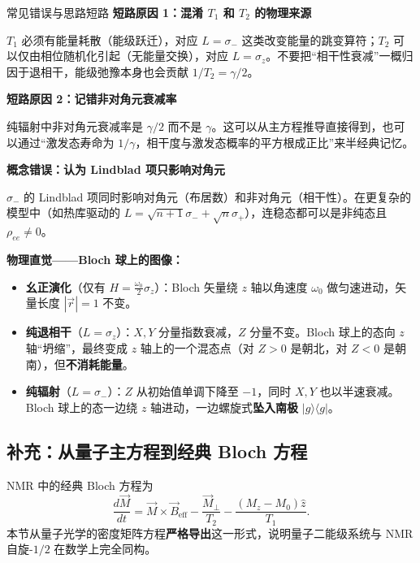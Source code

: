 \begin{errorbox}[colback=white]{常见错误与思路短路}
\textbf{短路原因 1：混淆 $T_1$ 和 $T_2$ 的物理来源}

$T_1$ 必须有能量耗散（能级跃迁），对应 $L=\sigma_-$ 这类改变能量的跳变算符；$T_2$ 可以仅由相位随机化引起（无能量交换），对应 $L=\sigma_z$。不要把``相干性衰减''一概归因于退相干，能级弛豫本身也会贡献 $1/T_2 = \gamma/2$。

\textbf{短路原因 2：记错非对角元衰减率}

纯辐射中非对角元衰减率是 $\gamma/2$ 而不是 $\gamma$。这可以从主方程推导直接得到，也可以通过``激发态寿命为 $1/\gamma$，相干度与激发态概率的平方根成正比''来半经典记忆。

\textbf{概念错误：认为 Lindblad 项只影响对角元}

$\sigma_-$ 的 Lindblad 项同时影响对角元（布居数）和非对角元（相干性）。在更复杂的模型中（如热库驱动的 $L=\sqrt{n+1}\sigma_- + \sqrt{n}\sigma_+$），连稳态都可以是非纯态且 $\rho_{ee}\neq 0$。
\end{errorbox}

\begin{insightbox}[举一反三与物理直觉]
\textbf{物理直觉——Bloch 球上的图像：}

\begin{itemize}[nosep]
    \item \textbf{幺正演化}（仅有 $H=\frac{\omega_0}{2}\sigma_z$）：Bloch 矢量绕 $z$ 轴以角速度 $\omega_0$ 做匀速进动，矢量长度 $|\vec{r}|=1$ 不变。
    \item \textbf{纯退相干}（$L=\sigma_z$）：$X,Y$ 分量指数衰减，$Z$ 分量不变。Bloch 球上的态向 $z$ 轴``坍缩''，最终变成 $z$ 轴上的一个混态点（对 $Z>0$ 是朝北，对 $Z<0$ 是朝南），但\textbf{不消耗能量}。
    \item \textbf{纯辐射}（$L=\sigma_-$）：$Z$ 从初始值单调下降至 $-1$，同时 $X,Y$ 也以半速衰减。Bloch 球上的态一边绕 $z$ 轴进动，一边螺旋式\textbf{坠入南极} $|g\rangle\langle g|$。
\end{itemize}
\end{insightbox}

\subsection{补充：从量子主方程到经典 Bloch 方程}

NMR 中的经典 Bloch 方程为
\[
\frac{d\vec{M}}{dt} = \vec{M}\times\vec{B}_{\text{eff}} - \frac{\vec{M}_\perp}{T_2} - \frac{(M_z-M_0)\hat{z}}{T_1}.
\]
本节从量子光学的密度矩阵方程\textbf{严格导出}这一形式，说明量子二能级系统与 NMR 自旋-$1/2$ 在数学上完全同构。

